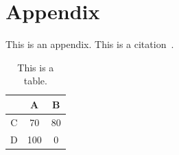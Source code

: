 \documentclass[english, dvipdfmx]{ampmt}             %
\def\numberofspines{1}
\begin{document}
\appendix

\section{Appendix}
This is an appendix. This is a citation~\cite{polya1945}.

\begin{table}[htbp]
  \caption{This is a table.}
  \centering
  \begin{tabular}{c|cc}
      &  A  &  B \\
    \hline
    C &  70 & 80 \\
    D & 100 &  0
  \end{tabular}
\end{table}

\fi
\ifoutputcover
\cleardoublepage
\makecover                      %
\makespine[\numberofspines]     %
\fi
\ifoutputabstractforsubmission
\makeabstractforsubmission      %
\fi
\end{document}
